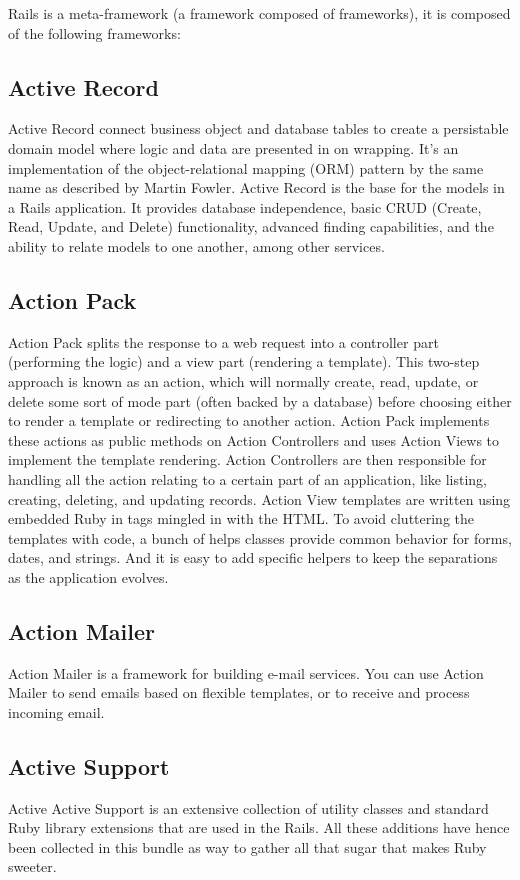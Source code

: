 Rails is a meta-framework (a framework composed of frameworks), it is composed of the following frameworks:

\subsection{Active Record}
Active Record connect business object and database tables to create a persistable domain model where logic and data are presented in on wrapping. It’s an implementation of the object-relational mapping (ORM) pattern by the same name as described by Martin Fowler.
Active Record is the base for the models in a Rails application. It provides database independence, basic CRUD (Create, Read, Update, and Delete) functionality, advanced finding capabilities, and the ability to relate models to one another, among other services.

\subsection{Action Pack} 
Action Pack splits the response to a web request into a controller part (performing the logic) and a view part (rendering a template). This two-step approach is known as an action, which will normally create, read, update, or delete some sort of mode part (often backed by a database) before choosing either to render a template or redirecting to another action.
Action Pack implements these actions as public methods on Action Controllers and uses Action Views to implement the template rendering. Action Controllers are then responsible for handling all the action relating to a certain part of an application, like listing, creating, deleting, and updating records.
Action View templates are written using embedded Ruby in tags mingled in with the HTML. To avoid cluttering the templates with code, a bunch of helps classes provide common behavior for forms, dates, and strings. And it is easy to add specific helpers to keep the separations as the application evolves.

\subsection{Action Mailer}  
Action Mailer is a framework for building e-mail services. You can use Action Mailer to send emails based on flexible templates, or to receive and process incoming email.

\subsection{Active Support} Active 
Active Support is an extensive collection of utility classes and standard Ruby library extensions that are used in the Rails. All these additions have hence been collected in this bundle as way to gather all that sugar that makes Ruby sweeter.


